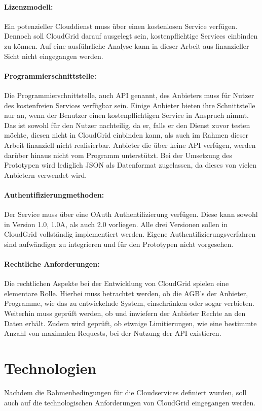 \paragraph{Lizenzmodell:} Ein potenzieller Clouddienst muss über einen kostenlosen Service verfügen.
Dennoch soll CloudGrid darauf ausgelegt sein, kostenpflichtige Services einbinden zu können.
Auf eine ausführliche Analyse kann in dieser Arbeit aus finanzieller Sicht nicht eingegangen werden.
\paragraph{Programmierschnittstelle:} Die Programmierschnittstelle, auch \ac{API} genannt, des Anbieters muss für Nutzer des kostenfreien Services verfügbar sein.
Einige Anbieter bieten ihre Schnittstelle nur an, wenn der Benutzer einen kostenpflichtigen Service in Anspruch nimmt.
Das ist sowohl für den Nutzer nachteilig, da er, falls er den Dienst zuvor testen möchte, diesen nicht in CloudGrid einbinden kann, als auch im Rahmen dieser Arbeit finanziell nicht realisierbar.
Anbieter die über keine \ac{API} verfügen, werden darüber hinaus nicht vom Programm unterstützt.
Bei der Umsetzung des Prototypen wird lediglich \ac{JSON} als Datenformat zugelassen, da dieses von vielen Anbietern verwendet wird.
\paragraph{Authentifizierungmethoden:} Der Service muss über eine OAuth Authentifizierung verfügen.
Diese kann sowohl in Version 1.0, 1.0A, als auch 2.0 vorliegen.
Alle drei Versionen sollen in CloudGrid vollständig implementiert werden.
Eigene Authentifizierungsverfahren sind aufwändiger zu integrieren und für den Prototypen nicht vorgesehen.
\paragraph{Rechtliche Anforderungen:} Die rechtlichen Aspekte bei der Entwicklung von CloudGrid spielen eine elementare Rolle.
Hierbei muss betrachtet werden, ob die AGB's der Anbieter, Programme, wie das zu entwickelnde System, einschränken oder sogar verbieten.
Weiterhin muss geprüft werden, ob und inwiefern der Anbieter Rechte an den Daten erhält.
Zudem wird geprüft, ob etwaige Limitierungen, wie eine bestimmte Anzahl von maximalen Requests, bei der Nutzung der \ac{API} existieren.

\section{Technologien}
\label{anforderungtech}
Nachdem die Rahmenbedingungen für die Cloudservices definiert wurden, soll auch auf die technologischen Anforderungen von CloudGrid eingegangen werden.

